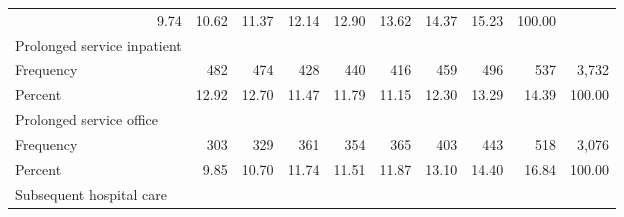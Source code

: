 \documentclass{article}
\begin{document}
\begin{table}[!h]
\begin{tabular}{llllllllll}
  \multicolumn{1}{|r}{9.74} &
  \multicolumn{1}{r}{10.62} &
  \multicolumn{1}{r}{11.37} &
  \multicolumn{1}{r}{12.14} &
  \multicolumn{1}{r}{12.90} &
  \multicolumn{1}{r}{13.62} &
  \multicolumn{1}{r}{14.37} &
  \multicolumn{1}{r}{15.23} &
  \multicolumn{1}{r}{100.00} \\
\multicolumn{1}{l}{\hspace{1em}Prolonged service inpatient} &
  \multicolumn{1}{|r}{} &
  \multicolumn{1}{r}{} &
  \multicolumn{1}{r}{} &
  \multicolumn{1}{r}{} &
  \multicolumn{1}{r}{} &
  \multicolumn{1}{r}{} &
  \multicolumn{1}{r}{} &
  \multicolumn{1}{r}{} &
  \multicolumn{1}{r}{} \\
\multicolumn{1}{l}{\hspace{2em}Frequency} &
  \multicolumn{1}{|r}{482} &
  \multicolumn{1}{r}{474} &
  \multicolumn{1}{r}{428} &
  \multicolumn{1}{r}{440} &
  \multicolumn{1}{r}{416} &
  \multicolumn{1}{r}{459} &
  \multicolumn{1}{r}{496} &
  \multicolumn{1}{r}{537} &
  \multicolumn{1}{r}{3,732} \\
\multicolumn{1}{l}{\hspace{2em}Percent} &
  \multicolumn{1}{|r}{12.92} &
  \multicolumn{1}{r}{12.70} &
  \multicolumn{1}{r}{11.47} &
  \multicolumn{1}{r}{11.79} &
  \multicolumn{1}{r}{11.15} &
  \multicolumn{1}{r}{12.30} &
  \multicolumn{1}{r}{13.29} &
  \multicolumn{1}{r}{14.39} &
  \multicolumn{1}{r}{100.00} \\
\multicolumn{1}{l}{\hspace{1em}Prolonged service office} &
  \multicolumn{1}{|r}{} &
  \multicolumn{1}{r}{} &
  \multicolumn{1}{r}{} &
  \multicolumn{1}{r}{} &
  \multicolumn{1}{r}{} &
  \multicolumn{1}{r}{} &
  \multicolumn{1}{r}{} &
  \multicolumn{1}{r}{} &
  \multicolumn{1}{r}{} \\
\multicolumn{1}{l}{\hspace{2em}Frequency} &
  \multicolumn{1}{|r}{303} &
  \multicolumn{1}{r}{329} &
  \multicolumn{1}{r}{361} &
  \multicolumn{1}{r}{354} &
  \multicolumn{1}{r}{365} &
  \multicolumn{1}{r}{403} &
  \multicolumn{1}{r}{443} &
  \multicolumn{1}{r}{518} &
  \multicolumn{1}{r}{3,076} \\
\multicolumn{1}{l}{\hspace{2em}Percent} &
  \multicolumn{1}{|r}{9.85} &
  \multicolumn{1}{r}{10.70} &
  \multicolumn{1}{r}{11.74} &
  \multicolumn{1}{r}{11.51} &
  \multicolumn{1}{r}{11.87} &
  \multicolumn{1}{r}{13.10} &
  \multicolumn{1}{r}{14.40} &
  \multicolumn{1}{r}{16.84} &
  \multicolumn{1}{r}{100.00} \\
\multicolumn{1}{l}{\hspace{1em}Subsequent hospital care} &

\end{tabular}
\end{table}
\end{document}
